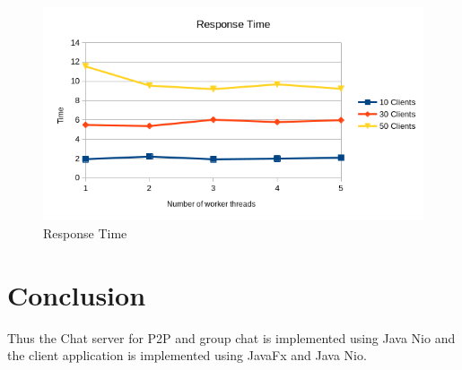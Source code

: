\documentclass{article}
\begin{document}
\begin{figure}
	\includegraphics[width=\linewidth]{responsetime.png}
	\caption{Response Time}
	\label{fig:responsetime}
\end{figure}

\section{Conclusion}

Thus the Chat server for P2P and group chat is implemented using Java Nio and the client application is implemented using JavaFx and Java Nio.
\end{document}
